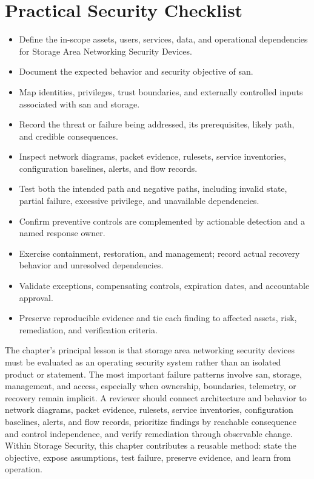 \documentclass[11pt]{article}
\begin{document}
\section*{Practical Security Checklist}
\begin{itemize}[label=$\square$]
\item Define the in-scope assets, users, services, data, and operational dependencies for Storage Area Networking Security Devices.
\item Document the expected behavior and security objective of san.
\item Map identities, privileges, trust boundaries, and externally controlled inputs associated with san and storage.
\item Record the threat or failure being addressed, its prerequisites, likely path, and credible consequences.
\item Inspect network diagrams, packet evidence, rulesets, service inventories, configuration baselines, alerts, and flow records.
\item Test both the intended path and negative paths, including invalid state, partial failure, excessive privilege, and unavailable dependencies.
\item Confirm preventive controls are complemented by actionable detection and a named response owner.
\item Exercise containment, restoration, and management; record actual recovery behavior and unresolved dependencies.
\item Validate exceptions, compensating controls, expiration dates, and accountable approval.
\item Preserve reproducible evidence and tie each finding to affected assets, risk, remediation, and verification criteria.
\end{itemize}
\begin{synthesisbox}
The chapter's principal lesson is that storage area networking security devices must be evaluated as an operating security system rather than an isolated product or statement. The most important failure patterns involve san, storage, management, and access, especially when ownership, boundaries, telemetry, or recovery remain implicit. A reviewer should connect architecture and behavior to network diagrams, packet evidence, rulesets, service inventories, configuration baselines, alerts, and flow records, prioritize findings by reachable consequence and control independence, and verify remediation through observable change. Within Storage Security, this chapter contributes a reusable method: state the objective, expose assumptions, test failure, preserve evidence, and learn from operation.
\end{synthesisbox}
\end{document}
